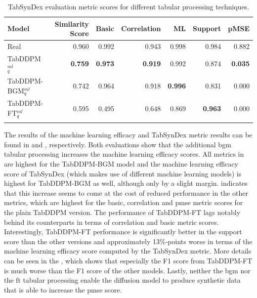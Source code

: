 \begin{table}[h]
	\centering
	\begin{tabular}{lrrrrrr}
		\toprule
		\textbf{Model}         & \textbf{Similarity Score} & \textbf{Basic} & \textbf{Correlation} & \textbf{ML}    & \textbf{Support} & \textbf{pMSE}  \\
		\midrule
		Real                   & 0.960                     & 0.992          & 0.943                & 0.998          & 0.984            & 0.882          \\
		TabDDPM$^{ml}_{q}$     & \textbf{0.759}            & \textbf{0.973} & \textbf{0.919}       & 0.992          & 0.874            & \textbf{0.035} \\
		TabDDPM-BGM$^{ml}_{q}$ & 0.742                     & 0.964          & 0.918                & \textbf{0.996} & 0.831            & 0.000          \\
		TabDDPM-FT$^{ml}_{q}$  & 0.595                     & 0.495          & 0.648                & 0.869          & \textbf{0.963}   & 0.000          \\
		\bottomrule
		\multicolumn{7}{c}{}\\[-0.6em]
	\end{tabular}
	\caption[Experiment 1 TabSynDex]{TabSynDex evaluation metric scores for different tabular processing techniques.}
	\label{tab:exp1-sim}
\end{table}

The results of the machine learning efficacy and TabSynDex metric results can be found in  and , respectively.
Both evaluations show that the additional \gls{bgm} tabular processing increases the machine learning efficacy scores.
All metrics in  are highest for the TabDDPM-BGM \gls{model} and the machine learning efficacy score of TabSynDex (which makes use of different machine learning models)
is highest for TabDDPM-BGM as well, although only by a slight margin.
 indicates that this increase seems to come at the cost of reduced performance in the other metrics, which are highest for the basic, correlation and \gls{pmse} metric scores for the plain TabDDPM version.
The performance of TabDDPM-FT lags notably behind its counterparts in terms of correlation and basic metric scores.
Interestingly, TabDDPM-FT performance is significantly better in the support score than the other versions and approximately 13\%-points worse in terms of the machine learning efficacy score computed by the TabSynDex metric.
More details can be seen in the , which shows that especially the F1 score from TabDDPM-FT is much worse than the F1 score of the other models.
Lastly, neither the \gls{bgm} nor the \gls{ft} tabular processing enable the diffusion \gls{model} to produce synthetic data that is able to increase the \gls{pmse} score.


